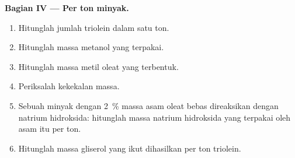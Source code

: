 \begin{problem}
\medskip
\noindent\textbf{Bagian IV --- Per ton minyak.}
\begin{enumerate}[resume]
  \item Hitunglah jumlah triolein dalam satu ton.
  \item Hitunglah massa metanol yang terpakai.
  \item Hitunglah massa metil oleat yang terbentuk.
  \item Periksalah kekekalan massa.
  \item Sebuah minyak dengan 2~\% massa asam oleat bebas direaksikan dengan
        natrium hidroksida: hitunglah massa natrium hidroksida yang terpakai
        oleh asam itu per ton.
  \item Hitunglah massa gliserol yang ikut dihasilkan per ton triolein.
\end{enumerate}
\end{problem}
